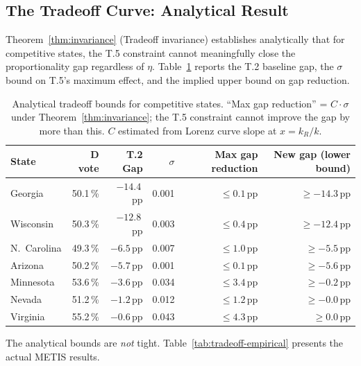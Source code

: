 \subsection{The Tradeoff Curve: Analytical Result}

Theorem~\ref{thm:invariance} (Tradeoff invariance) establishes analytically that
for competitive states, the T.5 constraint cannot meaningfully close the
proportionality gap regardless of $\eta$.
Table~\ref{tab:tradeoff} reports the T.2 baseline gap, the $\sigma$ bound
on T.5's maximum effect, and the implied upper bound on gap reduction.

\begin{table}[h]
\centering
\caption{Analytical tradeoff bounds for competitive states.
``Max gap reduction'' = $C \cdot \sigma$ under Theorem~\ref{thm:invariance};
the T.5 constraint cannot improve the gap by more than this.
$C$ estimated from Lorenz curve slope at $x = k_R/k$.}
\label{tab:tradeoff}
\small
\begin{tabular}{lrrrrr}
\toprule
State & D vote & T.2 Gap & $\sigma$ & Max gap reduction & New gap (lower bound) \\
\midrule
Georgia       & 50.1\,\% & $-14.4$\,pp & 0.001 & $\leq 0.1$\,pp & $\geq -14.3$\,pp \\
Wisconsin     & 50.3\,\% & $-12.8$\,pp & 0.003 & $\leq 0.4$\,pp & $\geq -12.4$\,pp \\
N.\ Carolina  & 49.3\,\% &  $-6.5$\,pp & 0.007 & $\leq 1.0$\,pp & $\geq -5.5$\,pp \\
Arizona       & 50.2\,\% &  $-5.7$\,pp & 0.001 & $\leq 0.1$\,pp & $\geq -5.6$\,pp \\
Minnesota     & 53.6\,\% &  $-3.6$\,pp & 0.034 & $\leq 3.4$\,pp & $\geq -0.2$\,pp \\
Nevada        & 51.2\,\% &  $-1.2$\,pp & 0.012 & $\leq 1.2$\,pp & $\geq -0.0$\,pp \\
Virginia      & 55.2\,\% &  $-0.6$\,pp & 0.043 & $\leq 4.3$\,pp & $\geq  0.0$\,pp \\
\bottomrule
\end{tabular}
\end{table}

\noindent The analytical bounds are \emph{not} tight.
Table~\ref{tab:tradeoff-empirical} presents the actual METIS results.

